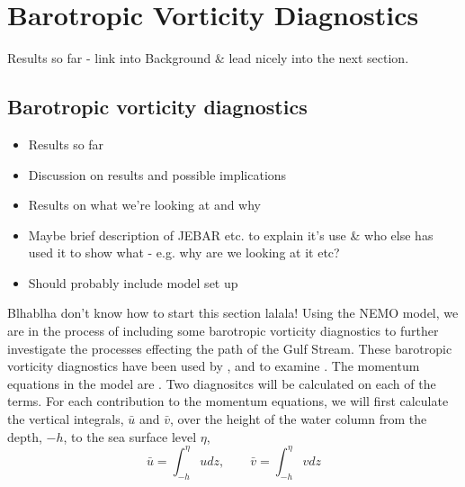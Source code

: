 \documentclass[..\EOYR.tex]{subfiles}
\begin{document}
\section{Barotropic Vorticity Diagnostics}

Results so far - link into Background \& lead nicely into the next section.
\subsection{Barotropic vorticity diagnostics}
\begin{itemize}
  \item Results so far
  \item Discussion on results and possible implications
  \item Results on what we're looking at and why
  \item Maybe brief description of JEBAR etc. to explain it's use \& who else has used it to show what - e.g. why are we looking at it etc?
  \item Should probably include model set up
\end{itemize}

Blhablha don't know how to start this section lalala!
Using the NEMO model, we are in the process of including some barotropic vorticity diagnostics to further investigate the processes effecting the path of the Gulf Stream. These barotropic vorticity diagnostics have been used by \citep{Bell1991},\citep{Gula???} and  to examine . The momentum equations in the model are . Two diagnositcs will be calculated on each of the  terms.  
For each contribution to the momentum equations, we will first calculate the vertical integrals, $\bar{u}$ and $\bar{v}$, over the height of the water column from the depth, $-h$, to the sea surface level $\eta$,
\begin{equation}
	\bar{u} = \int_{-h}^{\eta} u dz ,\qquad \bar{v} = \int_{-h}^{\eta} v dz 
\end {equation}
\end{document}
